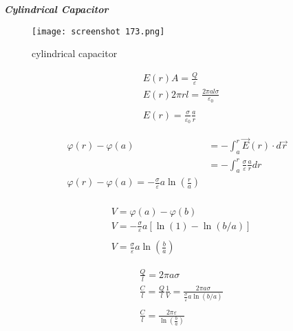 \documentclass[svgnames]{article}   	%
\begin{document}
\noindent \textit{ \textbf{Cylindrical Capacitor}}

\begin{figure}[H]
  \centering
    \texttt{[image: screenshot 173.png]}
    \caption{cylindrical capacitor}
\end{figure}



\begin{align*}
  & E(r) A = \frac{Q}{\varepsilon} \\
  & E(r) 2\pi r l = \frac{2 \pi a l \sigma}{\varepsilon_0} \\\\
  & E(r) = \frac{\sigma}{\varepsilon_0} \frac{a}{r}
\end{align*}

\begin{align*}
  \varphi(r) - \varphi(a) &= -\int_a^r \vec{E}(r) \cdot d\vec{r} \\
                          &= -\int_a^r \frac{\sigma}{\varepsilon} \frac{a}{r}
                          dr \\
  \varphi(r) - \varphi(a) = -\frac{\sigma}{\varepsilon} a \ln \left(\frac{r}{a}
  \right) \\ 
\end{align*}

\begin{align*}
  & V = \varphi(a) - \varphi(b) \\
  & V = -\frac{\sigma}{\varepsilon}a \left[ \ln (1) - \ln (b/a) \right] \\ \\
  & V = \frac{\sigma}{\varepsilon}a\ln\left(\frac{b}{a}\right)
\end{align*}

\begin{align*}
  &\frac{Q}{l} = 2 \pi a \sigma \\
  &\frac{C}{l} = \frac{Q}{l} \frac{1}{V} = \frac{2\pi
  a \sigma}{\frac{\sigma}{\varepsilon}a \ln (b/a)} \\\\
  & \frac{C}{l} = \frac{2 \pi \varepsilon}{ \ln \left(\frac{b}{a}\right)}
\end{align*}
\end{document}
